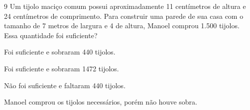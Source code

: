 







\num{9} Um tijolo maciço comum possui aproximadamente 11 centímetros de
altura e 24 centímetros de comprimento. Para construir uma parede de sua
casa com o tamanho de 7 metros de largura e 4 de altura, Manoel comprou
1.500 tijolos. Essa quantidade foi suficiente?

\begin{escolha}
\item Foi suficiente e sobraram 440 tijolos.
\item Foi suficiente e sobraram 1472 tijolos.
\item Não foi suficiente e faltaram 440 tijolos.
\item Manoel comprou os tijolos necessários, porém não houve sobra.
\end{escolha}






